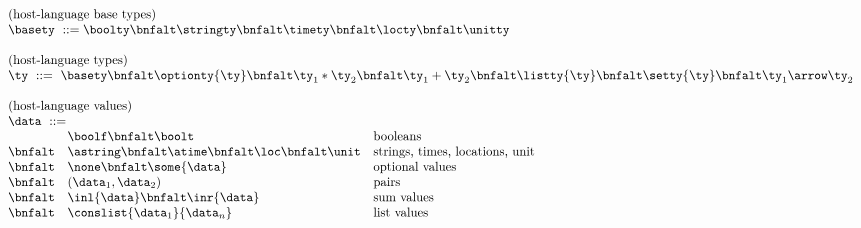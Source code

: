 \begin{figure}[t]
\[
\begin{array}{lll}
\multicolumn{3}{l}{\mbox{(host-language base types)}}\\ 
\multicolumn{3}{l}{\basety \ ::= \boolty \bnfalt \stringty \bnfalt
  \timety \bnfalt \locty \bnfalt \unitty} \\
\\
\multicolumn{3}{l}{\mbox{(host-language types)}}\\ 
\multicolumn{3}{l}{\ty \ ::=\ \basety
\bnfalt \optionty{\ty}
\bnfalt \ty_1 * \ty_2
\bnfalt \ty_1 + \ty_2
\bnfalt \listty{\ty}
\bnfalt \setty{\ty}
\bnfalt \ty_1 \arrow \ty_2
} \\
\\
\multicolumn{3}{l}{\mbox{(host-language values)}}\\ 
\multicolumn{3}{l}{\data \ ::=} \\
& \boolf \bnfalt \boolt & \mbox{booleans} \\
\bnfalt & \astring \bnfalt \atime \bnfalt \loc \bnfalt \unit &
 \mbox{strings, times, locations, unit} \\
\bnfalt & \none \bnfalt 
                           \some{\data} & \mbox{optional values}\\
\bnfalt & (\data_1,\data_2) & \mbox{pairs} \\
\bnfalt & \inl{\data} \bnfalt 
                           \inr{\data} & \mbox{sum values} \\
\bnfalt & 
                           \conslist{\data_1}{\data_n} & \mbox{list values} \\


\end{array}\]
\end{figure}

